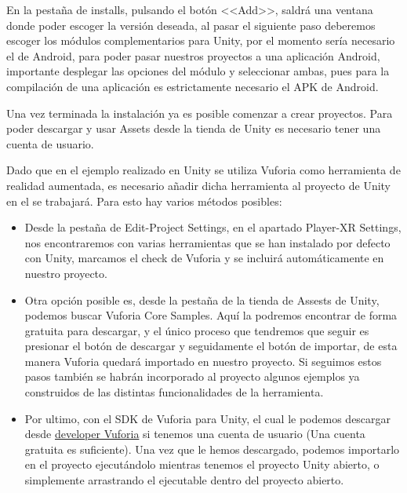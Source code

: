 En la pestaña de installs, pulsando el botón <<Add>>, saldrá una ventana donde poder escoger la versión deseada, al pasar el siguiente paso deberemos escoger los módulos complementarios para Unity, por el momento sería necesario el de Android, para poder pasar nuestros proyectos a una aplicación Android, importante desplegar las opciones del módulo y seleccionar ambas, pues para la compilación de una aplicación es estrictamente necesario el APK de Android.

Una vez terminada la instalación ya es posible comenzar a crear proyectos. 
Para poder descargar y usar Assets desde la tienda de Unity es necesario tener una cuenta de usuario.

Dado que en el ejemplo realizado en Unity se utiliza Vuforia como herramienta de realidad aumentada, es necesario añadir dicha herramienta al proyecto de Unity en el se trabajará. Para esto hay varios métodos posibles:
\begin{itemize}
\item Desde la pestaña de Edit-Project Settings, en el apartado Player-XR Settings, nos encontraremos con varias herramientas que se han instalado por defecto con Unity, marcamos el check de Vuforia y se incluirá automáticamente en nuestro proyecto.

\item Otra opción posible es, desde la pestaña de la tienda de Assests de Unity, podemos buscar Vuforia Core Samples. Aquí la podremos encontrar de forma gratuita para descargar, y el único proceso que tendremos que seguir es presionar el botón de descargar y seguidamente el botón de importar, de esta manera Vuforia quedará importado en nuestro proyecto. Si seguimos estos pasos también se habrán incorporado al proyecto algunos ejemplos ya construidos de las distintas funcionalidades de la herramienta.

\item Por ultimo, con el SDK de Vuforia para Unity, el cual le podemos descargar desde \href{https://developer.vuforia.com/downloads/sdk}{developer Vuforia} si tenemos una cuenta de usuario (Una cuenta gratuita es suficiente). Una vez que le hemos descargado, podemos importarlo en el proyecto ejecutándolo mientras tenemos el proyecto Unity abierto, o simplemente arrastrando el ejecutable dentro del proyecto abierto.	
\end{itemize}


